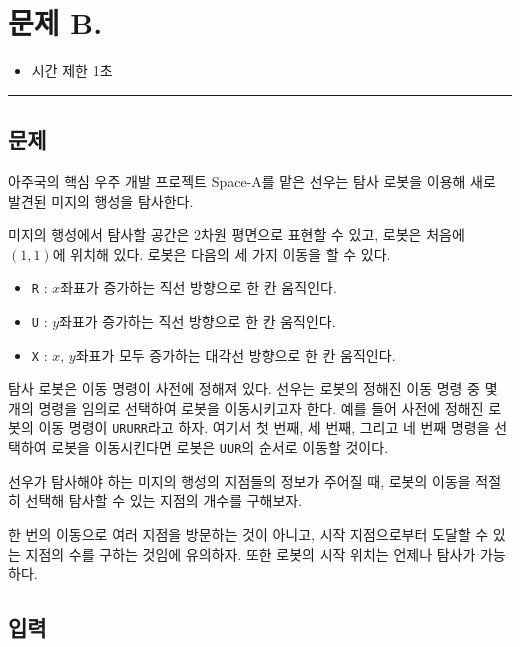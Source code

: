 \newpage
\section*{{\Large 문제 B.} }

\begin{itemize}
    \item 시간 제한 \tabto{2cm} 1초
\end{itemize}

\hrule

\subsection*{문제}

아주국의 핵심 우주 개발 프로젝트 Space-A를 맡은 선우는 탐사 로봇을 이용해 새로 발견된 미지의 행성을 탐사한다.

미지의 행성에서 탐사할 공간은 2차원 평면으로 표현할 수 있고, 로봇은 처음에 $(1, 1)$에 위치해 있다. 로봇은 다음의 세 가지 이동을 할 수 있다.

\begin{itemize}
    \item \texttt{\color{red}R} : $x$좌표가 증가하는 직선 방향으로 한 칸 움직인다.
    \item \texttt{\color{red}U} : $y$좌표가 증가하는 직선 방향으로 한 칸 움직인다.
    \item \texttt{\color{red}X} : $x$, $y$좌표가 모두 증가하는 대각선 방향으로 한 칸 움직인다.
\end{itemize}

탐사 로봇은 이동 명령이 사전에 정해져 있다. 선우는 로봇의 정해진 이동 명령 중 몇 개의 명령을 임의로 선택하여 로봇을 이동시키고자 한다. 예를 들어 사전에 정해진 로봇의 이동 명령이 \texttt{\color{red}URURR}라고 하자. 여기서 첫 번째, 세 번째, 그리고 네 번째 명령을 선택하여 로봇을 이동시킨다면 로봇은 \texttt{\color{red}UUR}의 순서로 이동할 것이다.

선우가 탐사해야 하는 미지의 행성의 지점들의 정보가 주어질 때, 로봇의 이동을 적절히 선택해 탐사할 수 있는 지점의 개수를 구해보자.

한 번의 이동으로 여러 지점을 방문하는 것이 아니고, 시작 지점으로부터 도달할 수 있는 지점의 수를 구하는 것임에 유의하자. 또한 로봇의 시작 위치는 언제나 탐사가 가능하다.

\subsection*{입력}

